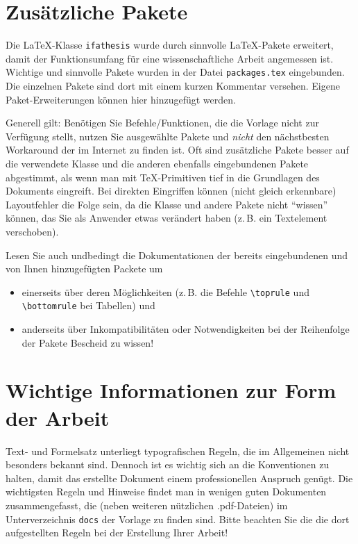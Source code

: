 \section{Zusätzliche Pakete}
\label{sec:ZusätzlichePakete}

Die \LaTeX-Klasse \verb-ifathesis- wurde durch sinnvolle \LaTeX-Pakete erweitert, damit der Funktionsumfang für eine wissenschaftliche Arbeit angemessen ist. Wichtige und sinnvolle Pakete wurden in der Datei \verb-packages.tex- eingebunden. Die einzelnen Pakete sind dort mit einem kurzen Kommentar versehen. Eigene Paket-Erweiterungen können hier hinzugefügt werden.

Generell gilt: Benötigen Sie Befehle/Funktionen, die die Vorlage nicht zur Verfügung stellt, nutzen Sie ausgewählte Pakete und \emph{nicht} den nächstbesten Workaround der im Internet zu finden ist. Oft sind zusätzliche Pakete besser auf die verwendete Klasse und die anderen ebenfalls eingebundenen Pakete abgestimmt, als wenn man mit \TeX-Primitiven tief in die Grundlagen des Dokuments eingreift. Bei direkten Eingriffen können (nicht gleich erkennbare) Layoutfehler die Folge sein, da die Klasse und andere Pakete nicht "`wissen"' können, das Sie als Anwender etwas verändert haben (z.\,B. ein Textelement verschoben).

Lesen Sie auch undbedingt die Dokumentationen der bereits eingebundenen und von Ihnen hinzugefügten Packete um
\begin{itemize}
  \item einerseits über deren Möglichkeiten (z.\,B. die Befehle \verb-\toprule- und \verb-\bottomrule- bei Tabellen) und
  \item anderseits über Inkompatibilitäten oder Notwendigkeiten bei der Reihenfolge der Pakete Bescheid zu wissen!
\end{itemize}


\section{Wichtige Informationen zur Form der Arbeit}
\label{sec:WichtigeInformationenZurFormDerArbeit}

Text- und Formelsatz unterliegt typografischen Regeln, die im Allgemeinen nicht besonders bekannt sind. Dennoch ist es wichtig sich an die Konventionen zu halten, damit das erstellte Dokument einem professionellen Anspruch genügt. Die wichtigsten Regeln und Hinweise findet man in wenigen guten Dokumenten zusammengefasst, die (neben weiteren nützlichen .pdf-Dateien) im Unterverzeichnis \verb-docs- der Vorlage zu finden sind. Bitte beachten Sie die die dort aufgestellten Regeln bei der Erstellung Ihrer Arbeit!
